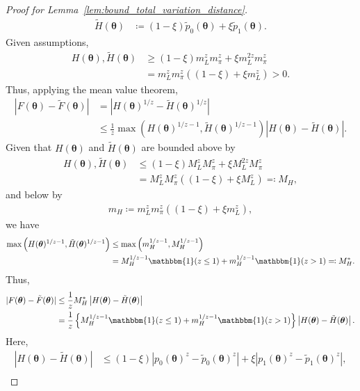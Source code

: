 \documentclass[10pt,a4paper]{amsart}
\begin{document}
\begin{proof}[Proof for Lemma~\ref{lem:bound_total_variation_distance}]
\begin{align*}
        \tilde{H}(\bm{\theta}) &\coloneqq(1 - \xi) \tilde{p}_0(\bm{\theta}) + \xi \tilde{p}_1(\bm{\theta}).
    \end{align*}
    Given assumptions,
    \begin{align*}
        H(\bm{\theta}), \tilde{H}(\bm{\theta}) &\geq (1 - \xi)m_L^z m_\pi^z + \xi m_L^{2z}m_\pi^z \\
        &= m_L^z m_\pi^z((1 - \xi) + \xi m_L^z) > 0.
    \end{align*}
    Thus, applying the mean value theorem,
    \begin{align*}
        |F(\bm{\theta}) - \tilde{F}(\bm{\theta})| &= \left|H(\bm{\theta})^{1 / z} - \tilde{H}(\bm{\theta})^{1 / z} \right| \\
        &\leq \frac{1}{z}\max\left(H(\bm{\theta})^{1/z - 1}, \tilde{H}(\bm{\theta})^{1/z - 1}\right)|H(\bm{\theta}) - \tilde{H}(\bm{\theta})|.
    \end{align*}
    Given that $H(\bm{\theta})$ and $\tilde{H}(\bm{\theta})$ are bounded above by
    \begin{align*}
        H(\bm{\theta}), \tilde{H}(\bm{\theta}) &\leq (1 - \xi) M_L^z M_\pi^z + \xi M_L^{2z}M_\pi^z \\
        &= M_L^z M_\pi^z \left((1 - \xi) + \xi M_L^z \right) \eqqcolon M_H,
    \end{align*}
    and below by
    \begin{align*}
        m_H \coloneqq m_L^z m_\pi^z((1 - \xi) + \xi m_L^z),
    \end{align*}
    we have
    \begin{align*}
        \max\left(H(\bm{\theta})^{1/z - 1}, \tilde{H}(\bm{\theta})^{1/z - 1}\right) &\leq \max\left(m_H^{1/z - 1}, M_H^{1/z - 1}\right) \\
        &= M_H^{1/z - 1} \mathbbm{1}(z \leq 1) + m_H^{1/z - 1}\mathbbm{1}(z > 1) \eqqcolon M^*_H.
    \end{align*}
    Thus,
    \begin{align*}
        |F(\bm{\theta}) - \tilde{F}(\bm{\theta})| &\leq \frac{1}{z} M_H^* \left|H(\bm{\theta}) - \tilde{H}(\bm{\theta})\right| \\
        &= \frac{1}{z}\left\{M_H^{1/z - 1} \mathbbm{1}(z \leq 1) + m_H^{1/z - 1}\mathbbm{1}(z > 1)\right\} \left|H(\bm{\theta}) - \tilde{H}(\bm{\theta})\right|.
    \end{align*}
    Here,
    \begin{align*}
        \left|H(\bm{\theta}) - \tilde{H}(\bm{\theta})\right| &\leq (1 - \xi) \left| p_0(\bm{\theta})^z - \tilde{p}_0(\bm{\theta})^z \right| + \xi \left| p_1(\bm{\theta})^z - \tilde{p}_1(\bm{\theta})^z \right|, \\

\end{align*}
\end{proof}
\end{document}
